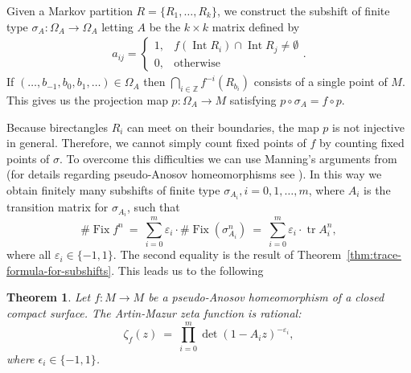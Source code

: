 \documentclass[oneside]{amsart}
\def\Z{\mathbb{Z}}
\def\Fix{\operatorname{Fix}}
\def\tr{\operatorname{tr}}
\def\Int{\operatorname{Int}}
\newtheorem{thm}{Theorem}
\begin{document}
Given a Markov partition $R = \{R_1, \ldots, R_k\}$, we construct the subshift of finite type
$\sigma_A: \Omega_A \to \Omega_A$ letting $A$ be the $k \times k$ matrix defined by
\begin{align*}
  a_{ij} = \begin{cases}
    1, &f(\Int R_i) \cap \Int R_j \neq \emptyset \\
    0, &\text{otherwise}
  \end{cases}.
\end{align*}
If $(\ldots,b_{-1},b_0,b_1,\ldots) \in \Omega_A$ then $\bigcap_{i \in \Z} f^{-i}(R_{b_i})$
consists of a single point of $M$.
This gives us the projection map $p: \Omega_A \to M$
satisfying $p \circ \sigma_A = f \circ p$.

Because birectangles $R_i$ can meet on their boundaries, the map $p$ is not injective in general.
Therefore, we cannot simply count fixed points of $f$ by counting fixed points of $\sigma$.
To overcome this difficulties we can use Manning's arguments from \cite{Man71}
(for details regarding pseudo-Anosov homeomorphisms see \cite[Lemma~27]{FelshB}).
In this way we obtain finitely many subshifts of finite type $\sigma_{A_i}, i=0,1,\ldots,m$,
where $A_i$ is the transition matrix for $\sigma_{A_i}$,
such that
\begin{equation} \label{eq:pseudo-Anosov-trace-formula}
  \#\Fix f^n \ = \ \sum_{i=0}^m \varepsilon_i \cdot \#\Fix(\sigma_{A_i}^n) \ = \ \sum_{i=0}^m \varepsilon_i \cdot \tr A_i^n,
\end{equation}
where all $\varepsilon_i \in \{-1,1\}$.
The second equality is the result of Theorem~\ref{thm:trace-formula-for-subshifts}.
This leads us to the following
\begin{thm} \label{thm:pseudo-Anosov-AM-rational}
  Let $f: M \to M$ be a pseudo-Anosov homeomorphism of a closed compact surface.
  The Artin-Mazur zeta function is rational:
  \begin{equation*}
    \zeta_f(z) \ = \ \prod_{i=0}^m \det(1 - A_i z)^{-\varepsilon_i},
  \end{equation*}
  where $\epsilon_i \in \{-1,1\}$.
\end{thm}
\end{document}
